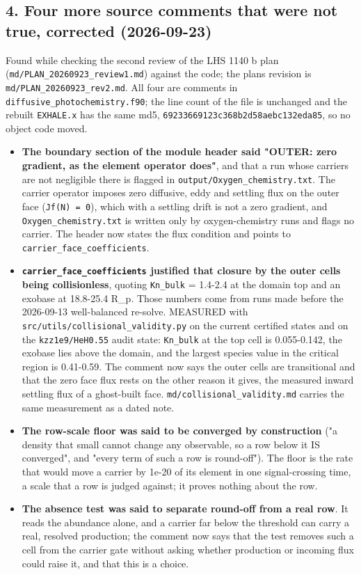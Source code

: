 \documentclass[english,a4paper]{my_memo}
\providecommand{\tightlist}{\setlength{\itemsep}{0pt}\setlength{\parskip}{0pt}}
\begin{document}
\subsection{4. Four more source comments that were not true, corrected (2026-09-23)}\label{4-four-more-source-comments-that-were-not-true-corrected-2026-09-23}

Found while checking the second review of the LHS 1140 b plan
(\texttt{md/PLAN\_20260923\_review1.md}) against the code; the plan\textquotesingle s revision is
\texttt{md/PLAN\_20260923\_rev2.md}. All four are comments in
\texttt{diffusive\_photochemistry.f90}; the line count of the file is unchanged and
the rebuilt \texttt{EXHALE.x} has the same md5, \texttt{69233669123c368b2d58aebc132eda85},
so no object code moved.

\begin{itemize}
\tightlist
\item
  \textbf{The boundary section of the module header said "OUTER: zero gradient,
  as the element operator does"}, and that a run whose carriers are not
  negligible there is flagged in \texttt{output/Oxygen\_chemistry.txt}. The carrier
  operator imposes zero diffusive, eddy and settling flux on the outer face
  (\texttt{Jf(N)\ =\ 0}), which with a settling drift is not a zero gradient, and
  \texttt{Oxygen\_chemistry.txt} is written only by oxygen-chemistry runs and flags
  no carrier. The header now states the flux condition and points to
  \texttt{carrier\_face\_coefficients}.
\item
  \textbf{\texttt{carrier\_face\_coefficients} justified that closure by the outer cells
  being collisionless}, quoting \texttt{Kn\_bulk} = 1.4-2.4 at the domain top and an
  exobase at 18.8-25.4 R\_p. Those numbers come from runs made before the
  2026-09-13 well-balanced re-solve. MEASURED with
  \texttt{src/utils/collisional\_validity.py} on the current certified states and on
  the \texttt{kzz1e9/HeH0.55} audit state: \texttt{Kn\_bulk} at the top cell is
  0.055-0.142, the exobase lies above the domain, and the largest species
  value in the critical region is 0.41-0.59. The comment now says the outer
  cells are transitional and that the zero face flux rests on the other
  reason it gives, the measured inward settling flux of a ghost-built face.
  \texttt{md/collisional\_validity.md} carries the same measurement as a dated note.
\item
  \textbf{The row-scale floor was said to be converged by construction} ("a
  density that small cannot change any observable, so a row below it IS
  converged", and "every term of such a row is round-off"). The floor is the
  rate that would move a carrier by 1e-20 of its element in one
  signal-crossing time, a scale that a row is judged against; it proves
  nothing about the row.
\item
  \textbf{The absence test was said to separate round-off from a real row}. It
  reads the abundance alone, and a carrier far below the threshold can carry
  a real, resolved production; the comment now says that the test removes
  such a cell from the carrier gate without asking whether production or
  incoming flux could raise it, and that this is a choice.
\end{itemize}
\end{document}
